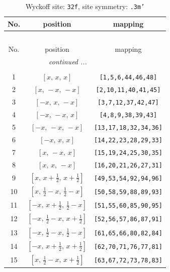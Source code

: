\documentclass[fleqn,8pt]{jsarticle}
\begin{document}
\begin{longtable}{ccc}
\caption{Wyckoff site: {\tt 32f}, site symmetry: {\tt .3m'}}
 \\
 \hline \hline
No. & position & mapping \\ \hline \endfirsthead

\multicolumn{2}{l}{\tablename\ \thetable{}} \\
 \hline \hline
No. & position & mapping \\ \hline \endhead

 \hline \hline
\multicolumn{2}{r}{\footnotesize\it continued ...} \\ \endfoot

 \hline \hline
\multicolumn{2}{r}{} \\ \endlastfoot

1 & $\left[ x,\, x,\, x \right]$ & {\tt [1,5,6,44,46,48]} \\ \hline
2 & $\left[ x,\, - x,\, - x \right]$ & {\tt [2,10,11,40,41,45]} \\ \hline
3 & $\left[ - x,\, x,\, - x \right]$ & {\tt [3,7,12,37,42,47]} \\ \hline
4 & $\left[ - x,\, - x,\, x \right]$ & {\tt [4,8,9,38,39,43]} \\ \hline
5 & $\left[ - x,\, - x,\, - x \right]$ & {\tt [13,17,18,32,34,36]} \\ \hline
6 & $\left[ - x,\, x,\, x \right]$ & {\tt [14,22,23,28,29,33]} \\ \hline
7 & $\left[ x,\, - x,\, x \right]$ & {\tt [15,19,24,25,30,35]} \\ \hline
8 & $\left[ x,\, x,\, - x \right]$ & {\tt [16,20,21,26,27,31]} \\ \hline
9 & $\left[ x,\, x + \frac{1}{2},\, x + \frac{1}{2} \right]$ & {\tt [49,53,54,92,94,96]} \\ \hline
10 & $\left[ x,\, \frac{1}{2} - x,\, \frac{1}{2} - x \right]$ & {\tt [50,58,59,88,89,93]} \\ \hline
11 & $\left[ - x,\, x + \frac{1}{2},\, \frac{1}{2} - x \right]$ & {\tt [51,55,60,85,90,95]} \\ \hline
12 & $\left[ - x,\, \frac{1}{2} - x,\, x + \frac{1}{2} \right]$ & {\tt [52,56,57,86,87,91]} \\ \hline
13 & $\left[ - x,\, \frac{1}{2} - x,\, \frac{1}{2} - x \right]$ & {\tt [61,65,66,80,82,84]} \\ \hline
14 & $\left[ - x,\, x + \frac{1}{2},\, x + \frac{1}{2} \right]$ & {\tt [62,70,71,76,77,81]} \\ \hline
15 & $\left[ x,\, \frac{1}{2} - x,\, x + \frac{1}{2} \right]$ & {\tt [63,67,72,73,78,83]} \\ \hline

\end{longtable}
\end{document}

